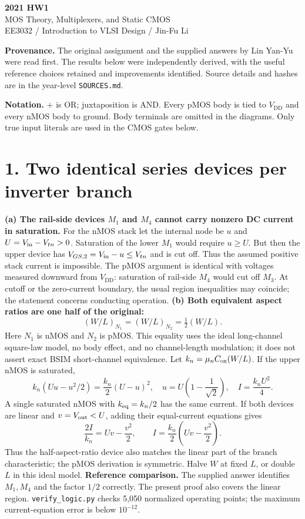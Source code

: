 \documentclass[11pt,a4paper]{article}
\newcommand{\VDD}{V_{\mathrm{DD}}}
\begin{document}
\begin{center}{\LARGE\bfseries 2021 HW1}\\[4pt]{\large MOS Theory, Multiplexers, and Static CMOS}\\[4pt]{\small EE3032 / Introduction to VLSI Design / Jin-Fu Li}\end{center}
\textbf{Provenance.} The original assignment and the supplied answers by Lin Yan-Yu were read first. The results below were independently derived, with the useful reference choices retained and improvements identified. Source details and hashes are in the year-level \texttt{SOURCES.md}.

\textbf{Notation.} $+$ is OR; juxtaposition is AND. Every pMOS body is tied to $\VDD$ and every nMOS body to ground. Body terminals are omitted in the diagrams. Only true input literals are used in the CMOS gates below.
\section*{1. Two identical series devices per inverter branch}
\textbf{(a) The rail-side devices $M_1$ and $M_4$ cannot carry nonzero DC current in saturation.}
For the nMOS stack let the internal node be $u$ and $U=V_{\rm in}-V_{tn}>0$.
Saturation of the lower $M_1$ would require $u\ge U$. But then the upper device has
$V_{GS,2}=V_{\rm in}-u\le V_{tn}$ and is cut off. Thus the assumed positive stack current is impossible. The pMOS argument is identical with voltages measured downward from $\VDD$: saturation of rail-side $M_4$ would cut off $M_3$.
At cutoff or the zero-current boundary, the usual region inequalities may coincide; the statement concerns conducting operation.
\textbf{(b) Both equivalent aspect ratios are one half of the original:}
\[
 \boxed{(W/L)_{N_1}=(W/L)_{N_2}=\tfrac12(W/L).}
\]
Here $N_1$ is nMOS and $N_2$ is pMOS. This equality uses the ideal long-channel square-law model, no body effect, and no channel-length modulation; it does not assert exact BSIM short-channel equivalence.
Let $k_n=\mu_n C_{\rm ox}(W/L)$. If the upper nMOS is saturated,
\[
 k_n(Uu-u^2/2)=\frac{k_n}{2}(U-u)^2,
 \quad u=U\left(1-\frac1{\sqrt2}\right),
 \quad I=\frac{k_nU^2}{4}.
\]
A single saturated nMOS with $k_{\rm eq}=k_n/2$ has the same current. If both devices are linear and $v=V_{\rm out}<U$, adding their equal-current equations gives
\[
 \frac{2I}{k_n}=Uv-\frac{v^2}{2},\qquad
 I=\frac{k_n}{2}\left(Uv-\frac{v^2}{2}\right).
\]
Thus the half-aspect-ratio device also matches the linear part of the branch characteristic; the pMOS derivation is symmetric. Halve $W$ at fixed $L$, or double $L$ in this ideal model.
\textbf{Reference comparison.} The supplied answer identifies $M_1,M_4$ and the factor $1/2$ correctly. The present proof also covers the linear region. \texttt{verify\_logic.py} checks 5,050 normalized operating points; the maximum current-equation error is below $10^{-12}$.
\newpage
\end{document}
